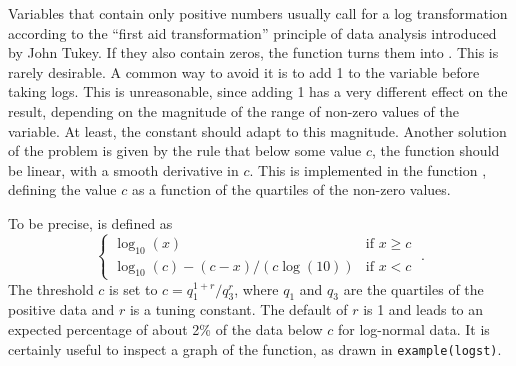\documentclass[11pt]{article}\usepackage[]{graphicx}\usepackage[]{color}
\begin{document}
Variables that contain only positive numbers usually call for a 
log transformation according to the ``first aid transformation'' principle
of data analysis introduced by John Tukey.
If they also contain zeros, the  function turns them into .
This is rarely desirable. 
A common way to avoid it is to add 1 to the variable before taking logs.
This is unreasonable, since adding 1 has a very different effect on the
result, depending on the magnitude of the range of non-zero values of the
variable. At least, the constant should adapt to this magnitude.
Another solution of the problem is given by the rule that below some
value $c$, the function should be linear, with a smooth derivative in $c$.
This is implemented in the function , defining the value $c$
as a function of the quartiles of the non-zero values.

To be precise,  is defined as
$$
         \left\{\begin{array}{ll}\log_{10}(x) & \mbox{if\ \ } x\ge c\\
         \log_{10}(c) - (c-x)/(c\log(10)) & \mbox{if\ \ } x< c
         \end{array}\right.
\;.$$
The threshold $c$ is set to
$ c = q_1^{1+r}/q_3^r$, where $q_1$ and $q_3$ are the quartiles of the 
positive data and $r$ is a tuning constant. 
The default of $r$ is 1 and leads to an expected
percentage of about 2\% of the data below $c$ for log-normal data.
It is certainly useful to inspect a graph of the function, as drawn in 
\texttt{example(logst)}.
\end{document}

